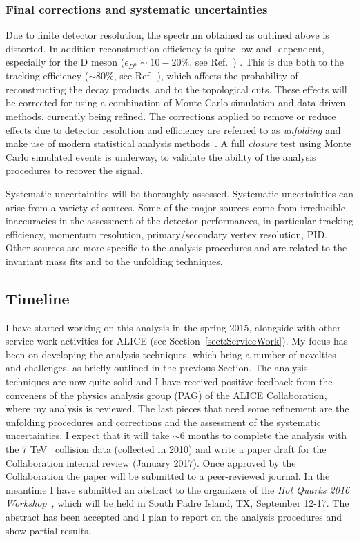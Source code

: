 \documentclass[12pt, a4paper, twoside, titlepage]{article}
\begin{document}
\subsubsection{Final corrections and systematic uncertainties}
Due to finite detector resolution, the spectrum obtained as outlined above is distorted. In addition reconstruction efficiency is quite low
and \pt-dependent, especially for the D meson ($\epsilon_{D^0} \sim 10-20\%$, see Ref.~\cite{}) . This is due both to the tracking efficiency ($\sim 80\%$, see Ref.~\cite{}),
which affects the probability of reconstructing the decay products, and to the topological cuts. These effects will be corrected for using a combination of Monte Carlo simulation and data-driven methods, currently being refined.
The corrections applied to remove or reduce effects due to detector resolution and efficiency are referred to as \emph{unfolding} and make use of modern statistical analysis methods~\cite{}.
A full \emph{closure} test using Monte Carlo simulated events is underway, to validate the ability of the analysis procedures to recover the signal.

Systematic uncertainties will be thoroughly assessed. Systematic uncertainties can arise from a variety of sources.
Some of the major sources come from irreducible inaccuracies in the assessment of the detector performances, in particular tracking efficiency, 
momentum resolution, primary/secondary vertex resolution, PID.
Other sources are more specific to the analysis procedures and are related to the invariant mass fits and to the unfolding techniques.

\subsection{Timeline}
I have started working on this analysis in the spring 2015, alongside with other service work activities for ALICE (see Section~\ref{sect:ServiceWork}).
My focus has been on developing the analysis techniques, which bring a number of novelties and challenges, as briefly outlined in the previous Section.
The analysis techniques are now quite solid and I have received positive feedback from the conveners of the physics analysis group (PAG) of the ALICE Collaboration,
where my analysis is reviewed. The last pieces that need some refinement are the unfolding procedures and corrections and the assessment of the systematic uncertainties.
I expect that it will take $\sim 6$ months to complete the analysis with the 7 TeV \pp\ collision data (collected in 2010) and write a paper draft for the Collaboration internal review (January 2017). Once approved
by the Collaboration the paper will be submitted to a peer-reviewed journal.
In the meantime I have submitted an abstract to the organizers of the \emph{Hot Quarks 2016 Workshop}~\cite{}, which will be held in South Padre Island, TX, September 12-17. 
The abstract has been accepted and I plan to report on the analysis procedures and show partial results.
\end{document}
